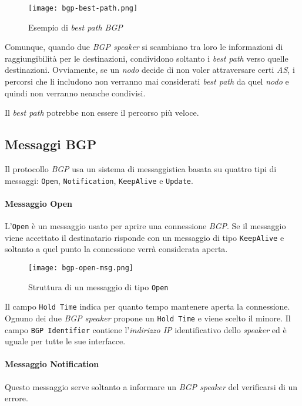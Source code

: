 \begin{figure}[ht]
    \centering
    \texttt{[image: bgp-best-path.png]}
    \caption{Esempio di \emph{best path BGP}}
\end{figure}

\newpage\noindent
Comunque, quando due \emph{BGP speaker} si scambiano tra loro le informazioni di
raggiungibilità per le destinazioni, condividono soltanto i \emph{best path}
verso quelle destinazioni. Ovviamente, se un \emph{nodo} decide di non voler
attraversare certi \emph{AS}, i percorsi che li includono non verranno mai
considerati \emph{best path} da quel \emph{nodo} e quindi non verranno neanche
condivisi.

\begin{note}
    Il \emph{best path} potrebbe non essere il percorso più veloce.
\end{note}

\subsection{Messaggi BGP}
Il protocollo \emph{BGP} usa un sistema di messaggistica basata su quattro tipi
di messaggi: \texttt{Open}, \texttt{Notification}, \texttt{KeepAlive} e
\texttt{Update}.

\paragraph{Messaggio Open}
L'\texttt{Open} è un messaggio usato per aprire una connessione \emph{BGP}.
Se il messaggio viene accettato il destinatario risponde con un messaggio di
tipo \texttt{KeepAlive} e soltanto a quel punto la connessione verrà considerata
aperta.

\begin{figure}[h!]
    \centering
    \texttt{[image: bgp-open-msg.png]}
    \caption{Struttura di un messaggio di tipo \texttt{Open}}
\end{figure}\noindent
Il campo \texttt{Hold Time} indica per quanto tempo mantenere aperta la
connessione. Ognuno dei due \emph{BGP speaker} propone un \texttt{Hold Time} e
viene scelto il minore. Il campo \texttt{BGP Identifier} contiene
l'\emph{indirizzo IP} identificativo dello \emph{speaker} ed è uguale per
tutte le sue interfacce.

\newpage
\paragraph{Messaggio Notification}
Questo messaggio serve soltanto a informare un \emph{BGP speaker} del verificarsi
di un errore.

